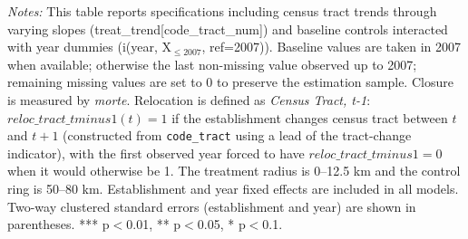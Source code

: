 \begin{supptable}[H]
{\begin{threeparttable}
   	\begin{tablenotes}[flushleft] \item \small \textit{Notes:} This table reports specifications including census tract trends through varying slopes (treat\_trend[code\_tract\_num]) and baseline controls interacted with year dummies (i(year, X$_{\le 2007}$, ref=2007)). Baseline values are taken in 2007 when available; otherwise the last non-missing value observed up to 2007; remaining missing values are set to 0 to preserve the estimation sample. Closure is measured by \textit{morte}. Relocation is defined as \textit{Census Tract, t-1}: $reloc\_tract\_tminus1(t)=1$ if the establishment changes census tract between $t$ and $t+1$ (constructed from \texttt{code\_tract} using a lead of the tract-change indicator), with the first observed year forced to have $reloc\_tract\_tminus1=0$ when it would otherwise be 1. The treatment radius is 0--12.5 km and the control ring is 50--80 km. Establishment and year fixed effects are included in all models. Two-way clustered standard errors (establishment and year) are shown in parentheses. *** p$<$0.01, ** p$<$0.05, * p$<$0.1.
   	\end{tablenotes}
   	\end{threeparttable}
   	}
\end{supptable}%
